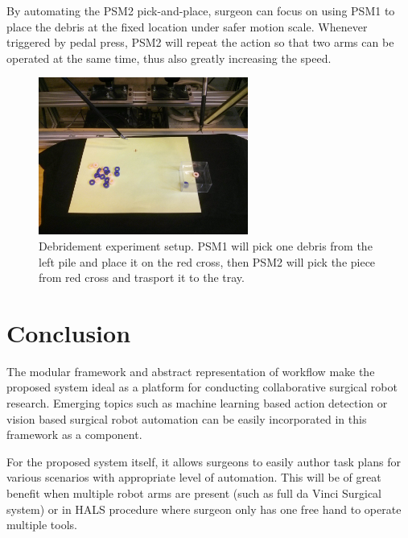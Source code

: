 \documentclass[letterpaper, 10 pt, conference]{ieeeconf}
\begin{document}
By automating the PSM2 pick-and-place, surgeon can focus on using PSM1 to place the debris at the fixed location under safer motion scale. Whenever triggered by pedal press, PSM2 will repeat the action so that two arms can be operated at the same time, thus also greatly increasing the speed.  


\begin{figure}[bt]
\centering
\includegraphics[width=195pt]{debridement.jpg}
\caption{Debridement experiment setup. PSM1 will pick one debris from the left pile and place it on the red cross, then PSM2 will pick the piece from red cross and trasport it to the tray.}
\label{fig:debridement}
\end{figure}


\section{Conclusion}
The modular framework and abstract representation of workflow make the proposed system ideal as a platform for conducting collaborative surgical robot research. Emerging topics such as machine learning based action detection or vision based surgical robot automation can be easily incorporated in this framework as a component. 

For the proposed system itself, it allows surgeons to easily author task plans for various scenarios with appropriate level of automation. This will be of great benefit when multiple robot arms are present (such as full da Vinci Surgical system) or in HALS procedure \cite{bauzano2016collaborative} where surgeon only has one free hand to operate multiple tools. 

\addtolength{\textheight}{-12cm}   %
\end{document}
